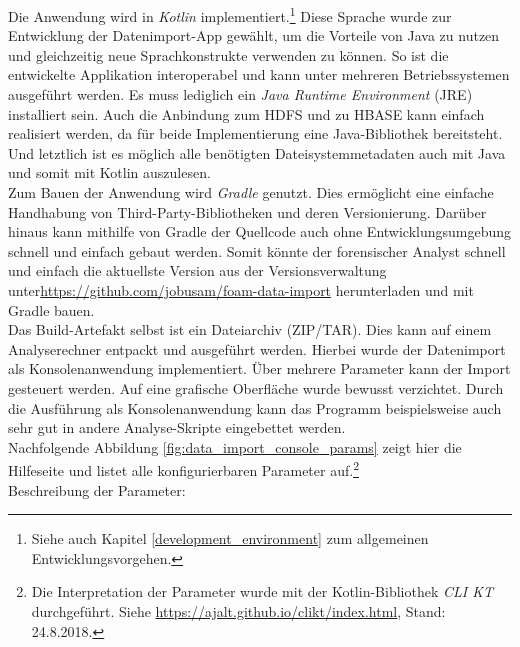 \noindent
Die Anwendung wird in \textit{Kotlin} implementiert.\footnote{Siehe auch Kapitel \ref{development_environment} zum allgemeinen Entwicklungsvorgehen.} Diese Sprache wurde zur Entwicklung der Datenimport-App gewählt, um die Vorteile von Java zu nutzen und gleichzeitig neue Sprachkonstrukte verwenden zu können. So ist die entwickelte Applikation interoperabel und kann unter mehreren Betriebssystemen ausgeführt werden. Es muss lediglich ein \textit{Java Runtime Environment} (JRE) installiert sein. Auch die Anbindung zum HDFS und zu HBASE kann einfach realisiert werden, da für beide Implementierung eine Java-Bibliothek bereitsteht. Und letztlich ist es möglich alle benötigten Dateisystemmetadaten auch mit Java und somit mit Kotlin auszulesen. \\
Zum Bauen der Anwendung wird \textit{Gradle} genutzt. Dies ermöglicht eine einfache Handhabung von Third-Party-Bibliotheken und deren Versionierung. Darüber hinaus kann mithilfe von Gradle der Quellcode auch ohne Entwicklungsumgebung schnell und einfach gebaut werden. Somit könnte der forensischer Analyst schnell und einfach die aktuellste Version aus der Versionsverwaltung unter\url{https://github.com/jobusam/foam-data-import} herunterladen und mit Gradle bauen.\\
Das Build-Artefakt selbst ist ein Dateiarchiv (ZIP/TAR). Dies kann auf einem Analyserechner entpackt und ausgeführt werden. Hierbei wurde der Datenimport als Konsolenanwendung implementiert. Über mehrere Parameter kann der Import gesteuert werden. Auf eine grafische Oberfläche wurde bewusst verzichtet. Durch die Ausführung als Konsolenanwendung kann das Programm beispielsweise auch sehr gut in andere Analyse-Skripte eingebettet werden.\\

\noindent
Nachfolgende Abbildung \ref{fig:data_import_console_params}  zeigt hier die Hilfeseite und listet alle konfigurierbaren Parameter auf.\footnote{Die Interpretation der Parameter wurde mit der Kotlin-Bibliothek \textit{CLI KT} durchgeführt. Siehe \url{https://ajalt.github.io/clikt/index.html}, Stand: 24.8.2018.}\\
Beschreibung der Parameter:

